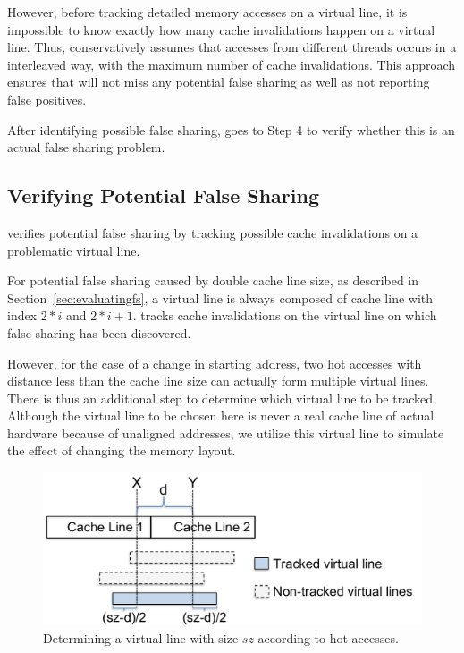 However, before tracking detailed memory accesses on a virtual line, it is impossible to know exactly how many cache invalidations happen on a virtual line. Thus, \Predator{} conservatively assumes that accesses from different threads occurs in a interleaved way, with the maximum number of cache invalidations. This approach ensures that \Predator{} will not miss any potential false sharing as well as 
not reporting false positives.  

  
After identifying possible false sharing, \Predator{} goes to Step 4 to verify whether this is an actual false sharing problem. 

\subsection{Verifying Potential False Sharing}
\label{sec:tracking}

\Predator{} verifies potential false sharing by tracking possible cache invalidations on a problematic virtual line.

For potential false sharing caused by double cache line size, as described in Section~\ref{sec:evaluatingfs}, a virtual line is always composed of cache line with index $2*i$ and $2*i+1$. 
\Predator{} tracks cache invalidations on the virtual line on which false sharing has been discovered.

However, for the case of a change in starting address,
two hot accesses with distance less than the cache line size 
can actually form multiple virtual lines. 
There is thus an additional step to determine which virtual line to be tracked.
Although the virtual line to be chosen here is never a real cache line of actual hardware because of unaligned addresses,
we utilize this virtual line to simulate the effect of changing the memory layout.


\begin{figure}
\begin{center} 
\includegraphics[width=6in]{predator/figure/trackpotential}
\end{center}
\caption{Determining a virtual line with size $sz$ according to hot accesses.}
\label{fig:trackpotential}
\end{figure}

